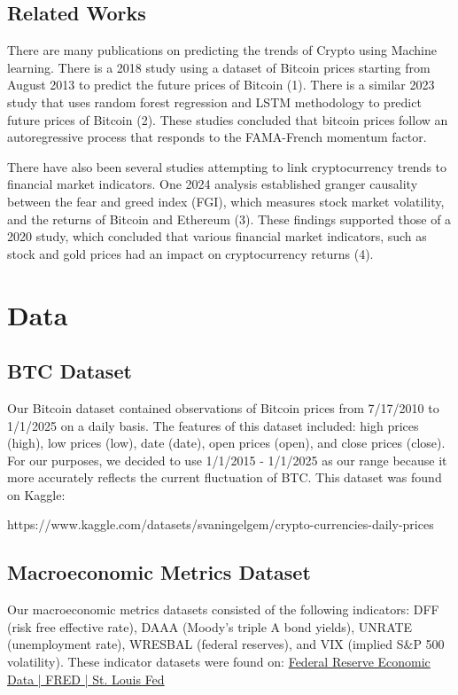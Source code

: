 \documentclass{article}
\begin{document}
\subsection{Related Works}
There are many publications on predicting the trends of Crypto using Machine learning. There is a 2018 study using a dataset of Bitcoin prices starting from August 2013 to predict the future prices of Bitcoin (1). There is a similar 2023 study that uses random forest regression and LSTM methodology to predict future prices of Bitcoin (2). These studies concluded that bitcoin prices follow an autoregressive process that responds to the FAMA-French momentum factor. 

There have also been several studies attempting to link cryptocurrency trends to financial market indicators. One 2024 analysis established granger causality between the fear and greed index (FGI), which measures stock market volatility, and the returns of Bitcoin and Ethereum (3). These findings supported those of a 2020 study, which concluded that various financial market indicators, such as stock and gold prices had an impact on cryptocurrency returns (4).


\section{Data}
\label{gen_inst}

\subsection{BTC Dataset}
Our Bitcoin dataset contained observations of Bitcoin prices from 7/17/2010 to 1/1/2025 on a daily basis. The features of this dataset included: high prices (high), low prices (low), date (date), open prices (open), and close prices (close). For our purposes, we decided to use 1/1/2015 - 1/1/2025 as our range because it more accurately reflects the current fluctuation of BTC. This dataset was found on Kaggle: 
\begin{center}
    https://www.kaggle.com/datasets/svaningelgem/crypto-currencies-daily-prices
\end{center}


\subsection{Macroeconomic Metrics Dataset}

Our macroeconomic metrics datasets consisted of the following indicators: DFF (risk free effective rate), DAAA (Moody’s triple A bond yields), UNRATE (unemployment rate), WRESBAL (federal reserves), and VIX (implied S\&P 500 volatility). 
These indicator datasets were found on:
\href{https://fred.stlouisfed.org/}{Federal Reserve Economic Data | FRED | St. Louis Fed}
\end{document}
